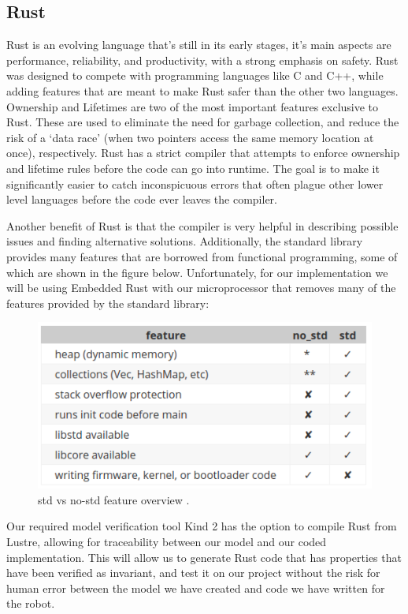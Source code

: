 \documentclass[a4paper,12pt]{article}
\begin{document}
\subsection{Rust}
Rust is an evolving language that’s still in its early stages, it’s main aspects are performance, reliability, and productivity, with a strong emphasis on safety.  Rust was designed to compete with programming languages like C and C++, while adding features that are meant to make Rust safer than the other two languages.  Ownership and Lifetimes are two of the most important features exclusive to Rust. These are used to eliminate the need for garbage collection, and reduce the risk of a ‘data race’ (when two pointers access the same memory location at once), respectively.  Rust has a strict compiler that attempts to enforce ownership and lifetime rules before the code can go into runtime.  The goal is to make it significantly easier to catch  inconspicuous errors that often plague other lower level languages before the code ever leaves the compiler. \par
Another benefit of Rust is that the compiler is very helpful in describing possible issues and finding alternative solutions.  Additionally, the standard library provides many features that are borrowed from functional programming, some of which are shown in the figure below. Unfortunately, for our implementation we will be using Embedded Rust with our microprocessor that removes many of the features provided by the standard library: \par
 \begin{figure}[H]
\includegraphics[width = \textwidth]{images/PDS_Rust.png}
\caption{std vs no-std feature overview \cite{greig}.}
	\end{figure}
Our required model verification tool Kind 2 has the option to compile Rust from Lustre, allowing for traceability between our model and our coded implementation.  This will allow us to generate Rust code that has properties that have been verified as invariant, and test it on our project without the risk for human error between the model we have created and code we have written for the robot. \par
\end{document}
